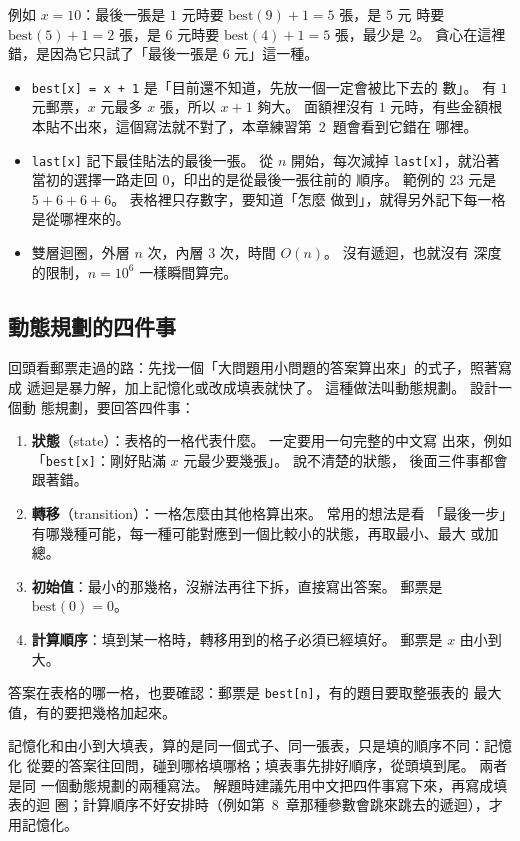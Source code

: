 例如 $x = 10$：最後一張是 $1$ 元時要 $\mathrm{best}(9) + 1 = 5$ 張，是 $5$ 元
時要 $\mathrm{best}(5) + 1 = 2$ 張，是 $6$ 元時要 $\mathrm{best}(4) + 1 = 5$
張，最少是 $2$。 貪心在這裡錯，是因為它只試了「最後一張是 $6$ 元」這一種。

\begin{itemize}
\item \texttt{best[x] = x + 1} 是「目前還不知道，先放一個一定會被比下去的
數」。 有 $1$ 元郵票，$x$ 元最多 $x$ 張，所以 $x + 1$ 夠大。 面額裡沒有 $1$
元時，有些金額根本貼不出來，這個寫法就不對了，本章練習第~2~題會看到它錯在
哪裡。
\item \texttt{last[x]} 記下最佳貼法的最後一張。 從 $n$ 開始，每次減掉
\texttt{last[x]}，就沿著當初的選擇一路走回 $0$，印出的是從最後一張往前的
順序。 範例的 $23$ 元是 $5 + 6 + 6 + 6$。 表格裡只存數字，要知道「怎麼
做到」，就得另外記下每一格是從哪裡來的。
\item 雙層迴圈，外層 $n$ 次，內層 $3$ 次，時間 $O(n)$。 沒有遞迴，也就沒有
深度的限制，$n = 10^6$ 一樣瞬間算完。
\end{itemize}

\subsection{動態規劃的四件事}
\label{sec:dp1-four}

回頭看郵票走過的路：先找一個「大問題用小問題的答案算出來」的式子，照著寫成
遞迴是暴力解，加上記憶化或改成填表就快了。 這種做法叫動態規劃。 設計一個動
態規劃，要回答四件事：

\begin{enumerate}
\item \textbf{狀態}（state）：表格的一格代表什麼。 一定要用一句完整的中文寫
出來，例如「\texttt{best[x]}：剛好貼滿 $x$ 元最少要幾張」。 說不清楚的狀態，
後面三件事都會跟著錯。
\item \textbf{轉移}（transition）：一格怎麼由其他格算出來。 常用的想法是看
「最後一步」有哪幾種可能，每一種可能對應到一個比較小的狀態，再取最小、最大
或加總。
\item \textbf{初始值}：最小的那幾格，沒辦法再往下拆，直接寫出答案。 郵票是
$\mathrm{best}(0) = 0$。
\item \textbf{計算順序}：填到某一格時，轉移用到的格子必須已經填好。 郵票是
$x$ 由小到大。
\end{enumerate}

答案在表格的哪一格，也要確認：郵票是 \texttt{best[n]}，有的題目要取整張表的
最大值，有的要把幾格加起來。

記憶化和由小到大填表，算的是同一個式子、同一張表，只是填的順序不同：記憶化
從要的答案往回問，碰到哪格填哪格；填表事先排好順序，從頭填到尾。 兩者是同
一個動態規劃的兩種寫法。 解題時建議先用中文把四件事寫下來，再寫成填表的迴
圈；計算順序不好安排時（例如第~8~章那種參數會跳來跳去的遞迴），才用記憶化。

